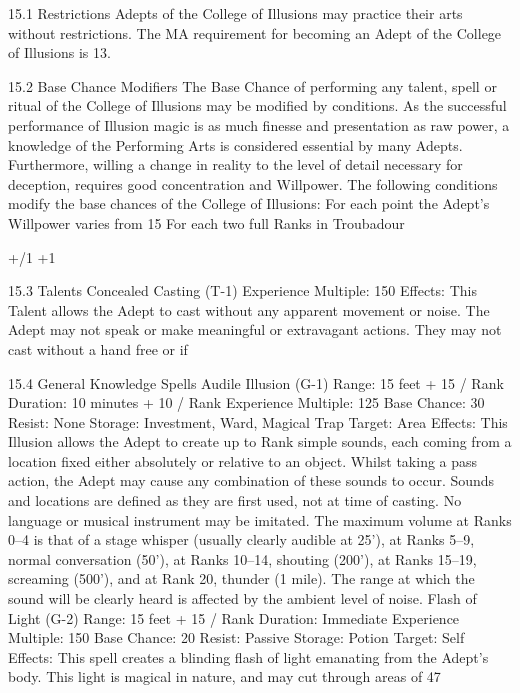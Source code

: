 \documentclass[a4paper]{article}
\begin{document}
\begin{multicols}{3}
15.1 Restrictions
Adepts of the College of Illusions may practice
their arts without restrictions.
The MA requirement for becoming an Adept of the
College of Illusions is 13.

15.2 Base Chance Modifiers
The Base Chance of performing any talent, spell or
ritual of the College of Illusions may be modified
by conditions.
As the successful performance of Illusion magic is
as much finesse and presentation as raw power, a
knowledge of the Performing Arts is considered
essential by many Adepts. Furthermore, willing a
change in reality to the level of detail necessary for
deception, requires good concentration and Willpower. The following conditions modify the base
chances of the College of Illusions:
For each point the Adept’s Willpower
varies from 15
For each two full Ranks in Troubadour

+/1
+1

15.3 Talents
Concealed Casting (T-1)
Experience Multiple: 150
Effects: This Talent allows the Adept to cast without any apparent movement or noise. The Adept
may not speak or make meaningful or extravagant
actions. They may not cast without a hand free or if

15.4 General Knowledge Spells
Audile Illusion (G-1)
Range: 15 feet + 15 / Rank
Duration: 10 minutes + 10 / Rank
Experience Multiple: 125
Base Chance: 30%
Resist: None
Storage: Investment, Ward, Magical Trap
Target: Area
Effects: This Illusion allows the Adept to create up
to Rank simple sounds, each coming from a location fixed either absolutely or relative to an object.
Whilst taking a pass action, the Adept may cause
any combination of these sounds to occur. Sounds
and locations are defined as they are first used, not
at time of casting. No language or musical instrument may be imitated. The maximum volume at
Ranks 0–4 is that of a stage whisper (usually
clearly audible at 25’), at Ranks 5–9, normal conversation (50’), at Ranks 10–14, shouting (200’), at
Ranks 15–19, screaming (500’), and at Rank 20,
thunder (1 mile). The range at which the sound will
be clearly heard is affected by the ambient level of
noise.
Flash of Light (G-2)
Range: 15 feet + 15 / Rank
Duration: Immediate
Experience Multiple: 150
Base Chance: 20%
Resist: Passive
Storage: Potion
Target: Self
Effects: This spell creates a blinding flash of light
emanating from the Adept’s body. This light is
magical in nature, and may cut through areas of
47


\end{multicols}
\end{document}
